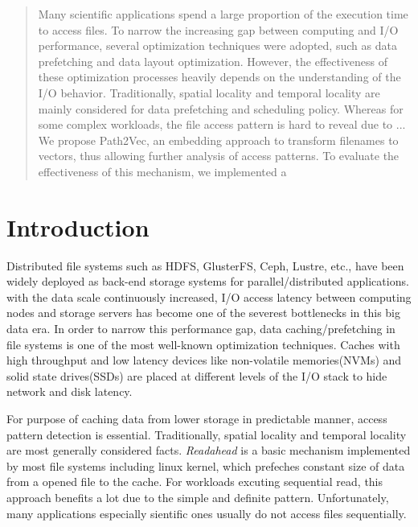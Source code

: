 \documentclass[conference]{IEEEtran}
\begin{document}
\begin{abstract}
    Many scientific applications spend a large proportion of the execution time to access files. 
    To narrow the increasing gap between computing and I/O performance, several optimization techniques were adopted, 
    such as data prefetching and data layout optimization. However, the effectiveness of these optimization processes heavily 
    depends on the understanding of the I/O behavior. Traditionally, spatial locality and temporal locality
    are mainly considered for data prefetching and scheduling policy. Whereas for some complex workloads, the file access pattern 
    is hard to reveal due to ... 
    We propose Path2Vec, an embedding approach to transform filenames to vectors, thus allowing further analysis of access patterns. 
    To evaluate the effectiveness of this mechanism, we implemented a 

\end{abstract}

\begin{IEEEkeywords}

\end{IEEEkeywords}

\section{Introduction}
Distributed file systems such as HDFS\cite{HDFS}, GlusterFS\cite{GlusterFS}, Ceph\cite{Ceph}, Lustre\cite{Lustre}, etc., have been widely deployed as back-end storage systems for parallel/distributed applications.
with the data scale continuously increased, I/O access latency between computing nodes and storage servers has become one of the severest bottlenecks in this big data era.
In order to narrow this performance gap, data caching/prefetching in file systems is one of the most well-known optimization techniques.
Caches with high throughput and low latency devices like non-volatile memories(NVMs) and solid state drives(SSDs) are placed at different levels of the I/O stack to hide network and disk latency.

For purpose of caching data from lower storage in predictable manner, access pattern detection is essential.
Traditionally, spatial locality and temporal locality are most generally considered facts. 
\textit{Readahead} is a basic mechanism implemented by most file systems\cite{WhyDoes} including linux kernel, which prefeches constant size of data from a opened file to the cache. 
For workloads excuting sequential read, this approach benefits a lot due to the simple and definite pattern.
Unfortunately, many applications especially sientific ones usually do not access files sequentially.
\end{document}
